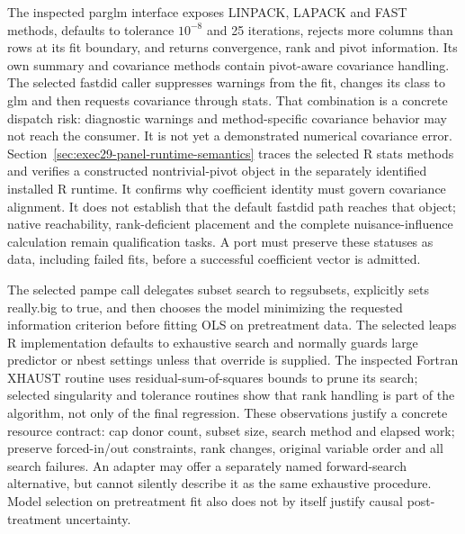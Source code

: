 The inspected parglm interface exposes LINPACK, LAPACK and FAST methods, defaults to tolerance $10^{-8}$ and 25 iterations, rejects more columns than rows at its fit boundary, and returns convergence, rank and pivot information. Its own summary and covariance methods contain pivot-aware covariance handling. The selected fastdid caller suppresses warnings from the fit, changes its class to glm and then requests covariance through stats. That combination is a concrete dispatch risk: diagnostic warnings and method-specific covariance behavior may not reach the consumer. It is not yet a demonstrated numerical covariance error. Section~\ref{sec:exec29-panel-runtime-semantics} traces the selected R stats methods and verifies a constructed nontrivial-pivot object in the separately identified installed R runtime. It confirms why coefficient identity must govern covariance alignment. It does not establish that the default fastdid path reaches that object; native reachability, rank-deficient placement and the complete nuisance-influence calculation remain qualification tasks. A port must preserve these statuses as data, including failed fits, before a successful coefficient vector is admitted.~\citep{exec28_panel_estimator_sources,exec29_panel_inference_sources}

The selected pampe call delegates subset search to regsubsets, explicitly sets really.big to true, and then chooses the model minimizing the requested information criterion before fitting OLS on pretreatment data. The selected leaps R implementation defaults to exhaustive search and normally guards large predictor or nbest settings unless that override is supplied. The inspected Fortran XHAUST routine uses residual-sum-of-squares bounds to prune its search; selected singularity and tolerance routines show that rank handling is part of the algorithm, not only of the final regression. These observations justify a concrete resource contract: cap donor count, subset size, search method and elapsed work; preserve forced-in/out constraints, rank changes, original variable order and all search failures. An adapter may offer a separately named forward-search alternative, but cannot silently describe it as the same exhaustive procedure. Model selection on pretreatment fit also does not by itself justify causal post-treatment uncertainty.~\citep{exec28_panel_delegates,exec29_panel_inference_sources}

